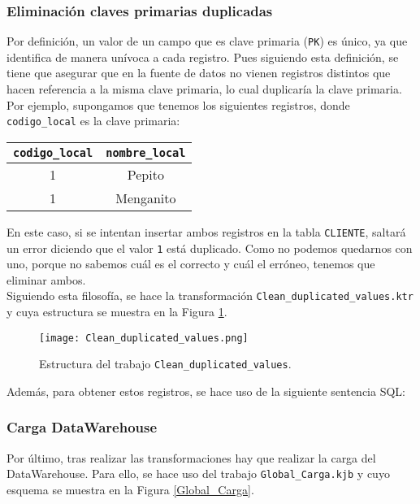 \subsubsection*{Eliminación claves primarias duplicadas}
Por definición, un valor de un campo que es clave primaria (\texttt{PK}) es único, ya que identifica de manera unívoca a cada registro. Pues siguiendo esta definición, se tiene que asegurar que en la fuente de datos no vienen registros distintos que hacen referencia a la misma clave primaria, lo cual duplicaría la clave primaria. Por ejemplo, supongamos que tenemos los siguientes registros, donde \texttt{codigo\_local} es la clave primaria:

\begin{center} 
\begin{table}[!th]
\begin{tabular}{|c|c|} \hline
\texttt{codigo\_local} & \texttt{nombre\_local} \\ \hline
1 & Pepito \\ \hline
1 & Menganito \\ \hline 
\end{tabular}
\centering
\end{table}
\end{center}

En este caso, si se intentan insertar ambos registros en la tabla \texttt{CLIENTE}, saltará un error diciendo que el valor \texttt{1} está duplicado. Como no podemos quedarnos con uno, porque no sabemos cuál es el correcto y cuál el erróneo, tenemos que eliminar ambos.\\

Siguiendo esta filosofía, se hace la transformación \texttt{Clean\_duplicated\_values.ktr} y cuya estructura se muestra en la Figura \ref{duplicated_values}.

\begin{figure}[!th]
\texttt{[image: Clean\_duplicated\_values.png]}
\centering
\caption{Estructura del trabajo \texttt{Clean\_duplicated\_values}.}
\label{duplicated_values}
\end{figure}

Además, para obtener estos registros, se hace uso de la siguiente sentencia SQL:





\medskip
\subsubsection{Carga DataWarehouse}
Por último, tras realizar las transformaciones hay que realizar la carga del DataWarehouse. Para ello, se hace uso del trabajo \texttt{Global\_Carga.kjb} y cuyo esquema se muestra en la Figura \ref{Global_Carga}.


